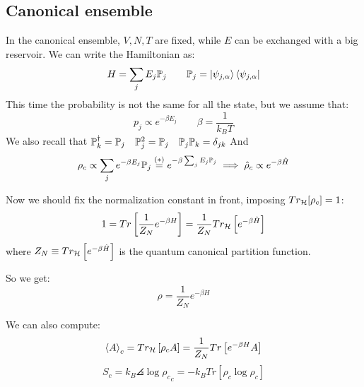\subsection{Canonical ensemble}
In the canonical ensemble, $V,N,T$ are fixed, while $E$ can be exchanged with a big reservoir. We can write the Hamiltonian as:
$$H = \sum_j E_j \mathbb{P}_j \qquad \mathbb{P}_j = \left|\psi_{j,\alpha}\right\rangle\left\langle\psi_{j,\alpha}\right|$$ 
This time the probability is not the same for all the state, but we assume that:
$$ p_j \propto e^{-\beta E_j} \qquad \beta = \frac 1{k_BT}$$
We also recall that $\mathbb{P}_k^\dag = \mathbb{P}_j \quad \mathbb{P}_j^2 = \mathbb{P}_j\quad \mathbb{P}_j\mathbb{P}_k = \delta_{jk}$
And
$$ \rho_c \propto \sum_j e^{-\beta E_j} \mathbb{P}_j \stackrel{(*)}= e^{-\beta \sum_j E_j \mathbb{P}_j} \implies \hat \rho_c \propto e^{-\beta \hat H}$$

Now we should fix the normalization constant in front, imposing $Tr_{\mathcal{H}}[\rho_c]= 1$:
$$1 = Tr\left[\frac 1{Z_N}e^{-\beta H}\right] = \frac 1{Z_N} Tr_{\mathcal{H}}\left[e^{-\beta \hat H}\right]$$
where $Z_N \equiv Tr_{\mathcal{H}} \left[e^{-\beta\hat H}\right]$ is the quantum canonical partition function.

So we get: $$\rho = \frac 1{Z_N} e^{-\beta H}$$

We can also compute:
$$ \left<A\right>_c = Tr_{\mathcal{H}}\left[\rho_cA\right] = \frac 1{Z_N} Tr\left[e^{-\beta H}A\right]$$
$$S_c = k_B\angles{\log \rho_c}_c = -k_B Tr\left[\rho_c \log \rho_c\right]$$

